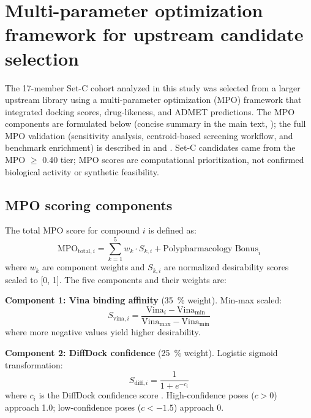 \documentclass[11pt,a4paper]{article}
\begin{document}
	\section{Multi-parameter optimization framework for upstream candidate selection}\label{sec:sm_mpo}
	The 17-member Set-C cohort analyzed in this study was selected from a larger upstream library using a multi-parameter optimization (MPO) framework that integrated docking scores, drug-likeness, and ADMET predictions. The MPO components are formulated below (concise summary in the main text, ); the full MPO validation (sensitivity analysis, centroid-based screening workflow, and benchmark enrichment) is described in  and . Set-C candidates came from the MPO $\geq$ \num{0.40} tier; MPO scores are computational prioritization, not confirmed biological activity or synthetic feasibility.
	
	\subsection{MPO scoring components}\label{sec:sm_mpo_components}
	The total MPO score for compound $i$ is defined as:
	\begin{equation}
		\text{MPO}_{\text{total}, i} = \sum_{k=1}^{5} w_k \cdot S_{k,i} + \text{Polypharmacology Bonus}_i
		\label{eq:sm_mpo_total}
	\end{equation}
	where $w_k$ are component weights and $S_{k,i}$ are normalized desirability scores scaled to [\num{0}, \num{1}]. The five components and their weights are:
	
	\textbf{Component 1: Vina binding affinity} (\qty{35}{\percent} weight). Min-max scaled:
	\begin{equation}
		S_{\text{vina}, i} = \frac{\text{Vina}_i - \text{Vina}_{\min}}{\text{Vina}_{\max} - \text{Vina}_{\min}}
		\label{eq:sm_vina}
	\end{equation}
	where more negative values yield higher desirability.
	
	\textbf{Component 2: DiffDock confidence} (\qty{25}{\percent} weight). Logistic sigmoid transformation:
	\begin{equation}
		S_{\text{diff}, i} = \frac{1}{1 + e^{-c_i}}
		\label{eq:sm_diffdock}
	\end{equation}
	where $c_i$ is the DiffDock confidence score \cite{Corso2023}. High-confidence poses ($c > \num{0}$) approach \num{1.0}; low-confidence poses ($c < \num{-1.5}$) approach \num{0}.
	
\end{document}

